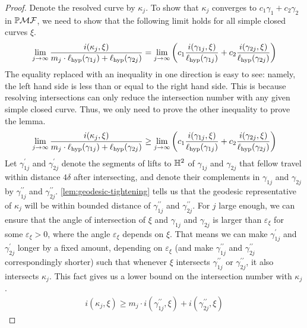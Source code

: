 \documentclass[12pt, reqno]{amsart}
\begin{document}
\begin{proof}
  Denote the resolved curve by $\kappa_j$.
  To show that $\kappa_j$ converges to $c_1 \gamma_1 + c_2 \gamma_2$ in $\mathbb{P}\mathcal{MF}$, we need to show that the following limit holds for all simple closed curves $\xi$.
  \begin{align}
    \label{eq:2}
    \lim_{j \to \infty} \frac{i(\kappa_j, \xi)}{m_j \cdot \ell_{\mathrm{hyp}}(\gamma_{1j}) + \ell_{\mathrm{hyp}}(\gamma_{2j})}
    = \lim_{j \to \infty} \left( c_1 \frac{i(\gamma_{1j}, \xi)}{\ell_{\mathrm{hyp}}(\gamma_{1j})} + c_2 \frac{i(\gamma_{2j}, \xi)}{\ell_{\mathrm{hyp}}(\gamma_{2j})} \right)
  \end{align}
  The equality replaced with an inequality in one direction is easy to see: namely, the left hand side is less than or equal to the right hand side.
  This is because resolving intersections can only reduce the intersection number with any given simple closed curve.
  Thus, we only need to prove the other inequality to prove the lemma.
  \begin{align}
    \label{eq:3}
    \lim_{j \to \infty} \frac{i(\kappa_j, \xi)}{m_j \cdot \ell_{\mathrm{hyp}}(\gamma_{1j}) + \ell_{\mathrm{hyp}}(\gamma_{2j})}
    \geq \lim_{j \to \infty} \left( c_1 \frac{i(\gamma_{1j}, \xi)}{\ell_{\mathrm{hyp}}(\gamma_{1j})} + c_2 \frac{i(\gamma_{2j}, \xi)}{\ell_{\mathrm{hyp}}(\gamma_{2j})} \right)
  \end{align}
  Let $\gamma_{1j}^{\prime}$ and $\gamma_{2j}^{\prime}$ denote the segments of lifts to $\mathbb{H}^2$ of $\gamma_{1j}$ and $\gamma_{2j}$ that fellow travel within distance $4\delta$ after intersecting, and denote their complements in $\gamma_{1j}$ and $\gamma_{2j}$ by $\gamma_{1j}^{\prime \prime}$ and $\gamma_{2j}^{\prime \prime}$.
  \autoref{lem:geodesic-tightening} tells us that the geodesic representative of $\kappa_j$ will be within bounded distance of $\gamma_{1j}^{\prime \prime}$ and $\gamma_{2j}^{\prime \prime}$.
  For $j$ large enough, we can ensure that the angle of intersection of $\xi$ and $\gamma_{1j}$ and $\gamma_{2j}$ is larger than $\varepsilon_\xi$ for some $\varepsilon_\xi > 0$, where the angle $\varepsilon_\xi$ depends on $\xi$.
  That means we can make $\gamma_{1j}^{\prime}$ and $\gamma_{2j}^{\prime}$ longer by a fixed amount, depending on $\varepsilon_\xi$ (and make $\gamma_{1j}^{\prime \prime}$ and $\gamma_{2j}^{\prime \prime}$ correspondingly shorter) such that whenever $\xi$ intersects $\gamma_{1j}^{\prime \prime}$ or $\gamma_{2j}^{\prime \prime}$, it also intersects $\kappa_j$.
  This fact gives us a lower bound on the intersection number with $\kappa_j$.
  \begin{align}
    \label{eq:4}
    i(\kappa_j, \xi) \geq m_j \cdot i(\gamma_{1j}^{\prime \prime}, \xi) + i(\gamma_{2j}^{\prime \prime}, \xi)

\end{align}
\end{proof}
\end{document}
